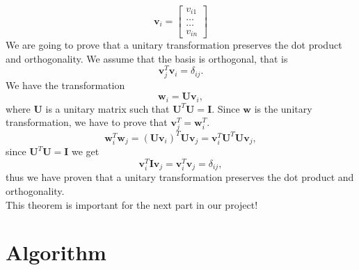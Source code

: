 \documentclass{article}
\begin{document}
\[
\mathbf{v}_i = \begin{bmatrix} v_{i1} \\ \dots \\ \dots \\v_{in} \end{bmatrix}
\]
We are going to prove that a unitary transformation preserves the dot product and orthogonality. 
We assume that the basis is orthogonal, that is 
\[
\mathbf{v}_j^T\mathbf{v}_i = \delta_{ij}.
\]
We have the transformation
\[
\mathbf{w}_i=\mathbf{U}\mathbf{v}_i,
\]
where $\mathbf{U}$ is a unitary matrix such that $\mathbf{U}^T\mathbf{U}=\mathbf{I}$. Since $\mathbf{w}$ is the unitary transformation, we have to prove that $\mathbf{v}_j^T = \mathbf{w}_i^T$. 
$$\mathbf{w}_i^T \mathbf{w}_j=(\mathbf{Uv}_i)^T\mathbf{Uv}_j=\mathbf{v}_i^T\mathbf{U}^T\mathbf{Uv}_j,$$ since $\mathbf{U}^T\mathbf{U}=\mathbf{I}$ we get 
$$\mathbf{v}_i^T\mathbf{I}\mathbf{v}_j=\mathbf{v}_i^T\mathbf{v}_j=\delta_{ij},$$ thus we have proven that a unitary transformation preserves the dot product and orthogonality. \\
This theorem is important for the next part in our project!

\section{Algorithm}
\end{document}

